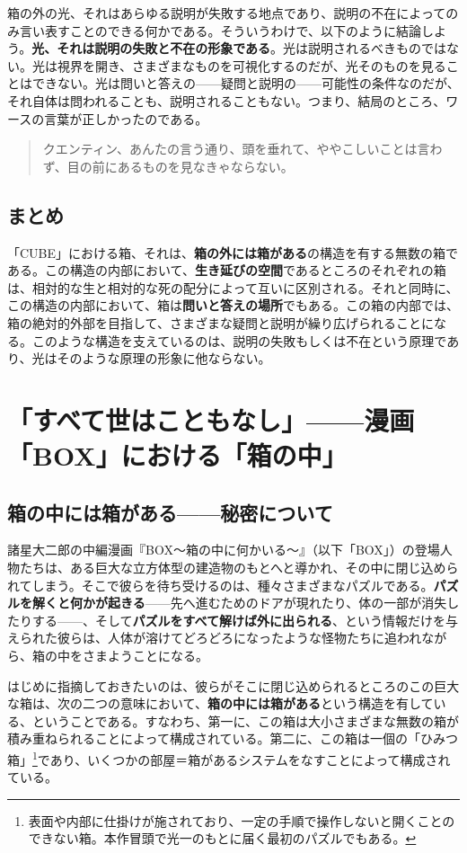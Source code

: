 \documentclass[b5j,twoside,twocolumn]{utarticle}
\begin{document}
箱の外の光、それはあらゆる説明が失敗する地点であり、説明の不在によってのみ言い表すことのできる何かである。そういうわけで、以下のように結論しよう。\textbf{光、それは説明の失敗と不在の形象である}。光は説明されるべきものではない。光は視界を開き、さまざまなものを可視化するのだが、光そのものを見ることはできない。光は問いと答えの------疑問と説明の------可能性の条件なのだが、それ自体は問われることも、説明されることもない。つまり、結局のところ、ワースの言葉が正しかったのである。

\begin{quote}
クエンティン、あんたの言う通り、頭を垂れて、ややこしいことは言わず、目の前にあるものを見なきゃならない。
\end{quote}

\subsection*{まとめ}

「CUBE」における箱、それは、\textbf{箱の外には箱がある}の構造を有する無数の箱である。この構造の内部において、\textbf{生き延びの空間}であるところのそれぞれの箱は、相対的な生と相対的な死の配分によって互いに区別される。それと同時に、この構造の内部において、箱は\textbf{問いと答えの場所}でもある。この箱の内部では、箱の絶対的外部を目指して、さまざまな疑問と説明が繰り広げられることになる。このような構造を支えているのは、説明の失敗もしくは不在という原理であり、光はそのような原理の形象に他ならない。

\section{「すべて世はこともなし」------漫画「BOX」における「箱の中」}


\subsection{\tbaselineshift =3.0pt 箱の中には箱がある------秘密について}
諸星大二郎の中編漫画『BOX～箱の中に何かいる～』（以下「BOX」）の登場人物たちは、ある巨大な立方体型の建造物のもとへと導かれ、その中に閉じ込められてしまう。そこで彼らを待ち受けるのは、種々さまざまなパズルである。\textbf{パズルを解くと何かが起きる}------先へ進むためのドアが現れたり、体の一部が消失したりする------、そして\textbf{パズルをすべて解けば外に出られる}、という情報だけを与えられた彼らは、人体が溶けてどろどろになったような怪物たちに追われながら、箱の中をさまようことになる。


はじめに指摘しておきたいのは、彼らがそこに閉じ込められるところのこの巨大な箱は、次の二つの意味において、\textbf{箱の中には箱がある}という構造を有している、ということである。すなわち、第一に、この箱は大小さまざまな無数の箱が積み重ねられることによって構成されている。第二に、この箱は一個の「ひみつ箱」\footnote{表面や内部に仕掛けが施されており、一定の手順で操作しないと開くことのできない箱。本作冒頭で光一のもとに届く最初のパズルでもある。}であり、いくつかの部屋＝箱があるシステムをなすことによって構成されている。
\end{document}

